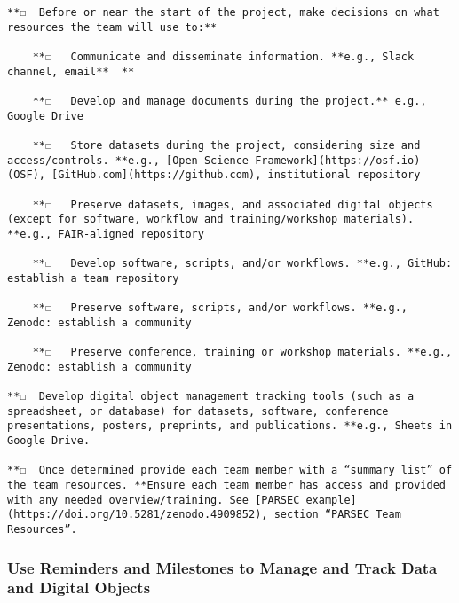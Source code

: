 \documentclass[
  letterpaper,
  DIV=11,
  numbers=noendperiod]{scrreport}
\begin{document}
\begin{verbatim}
**☐  Before or near the start of the project, make decisions on what resources the team will use to:**

    **☐   Communicate and disseminate information. **e.g., Slack channel, email**  **

    **☐   Develop and manage documents during the project.** e.g., Google Drive   

    **☐   Store datasets during the project, considering size and access/controls. **e.g., [Open Science Framework](https://osf.io) (OSF), [GitHub.com](https://github.com), institutional repository

    **☐   Preserve datasets, images, and associated digital objects (except for software, workflow and training/workshop materials). **e.g., FAIR-aligned repository

    **☐   Develop software, scripts, and/or workflows. **e.g., GitHub: establish a team repository

    **☐   Preserve software, scripts, and/or workflows. **e.g., Zenodo: establish a community    

    **☐   Preserve conference, training or workshop materials. **e.g., Zenodo: establish a community 

**☐  Develop digital object management tracking tools (such as a spreadsheet, or database) for datasets, software, conference presentations, posters, preprints, and publications. **e.g., Sheets in Google Drive.  

**☐  Once determined provide each team member with a “summary list” of the team resources. **Ensure each team member has access and provided with any needed overview/training. See [PARSEC example](https://doi.org/10.5281/zenodo.4909852), section “PARSEC Team Resources”.
\end{verbatim}

\hypertarget{use-reminders-and-milestones-to-manage-and-track-data-and-digital-objects}{%
\subsubsection{Use Reminders and Milestones to Manage and Track Data and
Digital
Objects}\label{use-reminders-and-milestones-to-manage-and-track-data-and-digital-objects}}
\end{document}
